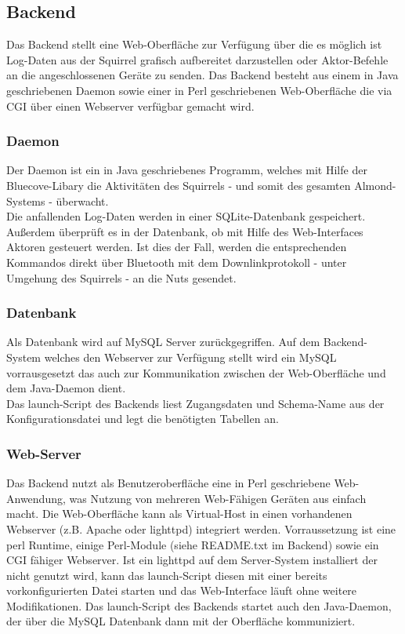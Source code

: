 \documentclass[12pt,a4paper]{article}
\begin{document}
\subsection{Backend}
Das Backend stellt eine Web-Oberfläche zur Verfügung über die es möglich ist Log-Daten aus der Squirrel grafisch aufbereitet darzustellen oder Aktor-Befehle an die angeschlossenen Geräte zu senden. Das Backend besteht aus einem in Java geschriebenen Daemon sowie einer in Perl geschriebenen Web-Oberfläche die via CGI über einen Webserver verfügbar gemacht wird.

\subsubsection{Daemon}
Der Daemon ist ein in Java geschriebenes Programm, welches mit Hilfe der Bluecove-Libary die Aktivitäten des Squirrels - und somit des gesamten Almond-Systems - überwacht.\\
Die anfallenden Log-Daten werden in einer SQLite-Datenbank gespeichert.\\
Außerdem überprüft es in der Datenbank, ob mit Hilfe des Web-Interfaces Aktoren gesteuert werden. Ist dies der Fall, werden die entsprechenden Kommandos direkt über Bluetooth mit dem Downlinkprotokoll - unter Umgehung des Squirrels - an die Nuts gesendet.\\

\subsubsection{Datenbank}
Als Datenbank wird auf MySQL Server zurückgegriffen. Auf dem Backend-System welches den Webserver zur Verfügung stellt wird ein MySQL vorrausgesetzt das auch zur Kommunikation zwischen der Web-Oberfläche und dem Java-Daemon dient. \\
Das launch-Script des Backends liest Zugangsdaten und Schema-Name aus der Konfigurationsdatei und legt die benötigten Tabellen an.

\subsubsection{Web-Server}
Das Backend nutzt als Benutzeroberfläche eine in Perl geschriebene Web-Anwendung, was Nutzung von mehreren Web-Fähigen Geräten aus einfach macht. Die Web-Oberfläche kann als Virtual-Host in einen vorhandenen Webserver (z.B. Apache oder lighttpd) integriert werden. Vorraussetzung ist eine perl Runtime, einige Perl-Module (siehe README.txt im Backend) sowie ein CGI fähiger Webserver. Ist ein lighttpd auf dem Server-System installiert der nicht genutzt wird, kann das launch-Script diesen mit einer bereits vorkonfigurierten Datei starten und das Web-Interface läuft ohne weitere Modifikationen.
Das launch-Script des Backends startet auch den Java-Daemon, der über die MySQL Datenbank dann mit der Oberfläche kommuniziert.
\end{document}
